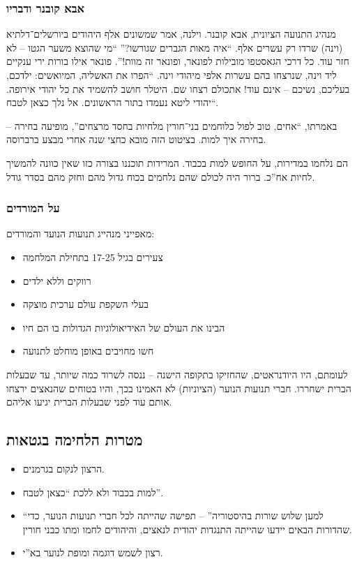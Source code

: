 \documentclass[a4paper]{book}
\begin{document}
	\subsubsection{אבא קובנר ודבריו}
	מנהיג התנועה הציונית, אבא קובנר. וילנה, אמר שמשונים אלף היהודים ביורשלים־דלתיא (וינה) שרדו רק עשרים אלף. ``איה מאות הגברים שגורשו?'' ``מי שהוצא משער הגטו – לא חזר עוד. כל דרכי הגאסטפו מובילות לפונאר, ופונאר זה מוות!''. פונאר אילו בורות ירי ענקיים ליד וינה, שנרצחו בהם עשרות אלפי מיהודי וינה. ``הפרו את האשליה, המיואשים: ילדכם, בעליכם, נשיכם – אינם עוד! אתכולם רצחו שם. היטלר חושב להשמיד את כל יהודי אירופה. יהודי ליטא נעמדו בתור הראשונים. אל נלך כצאן לטבח``. 
	
	באמרתו, ``אחים, טוב לפול כלוחמים בני־חורין מלחיות בחסד מרצחים'', מופיעה בחירה – בחירה איך למות. בציטוט הזה מובא כחצי שנה אחרי מבצע ברברוסה. 
	
	הם נלחמו במדירות, על החופש למות בכבוד. המרידות תוכננו בצורה כזו שאין כוונה להמשיך לחיות אח''כ. ברור היה לכולם שהם נלחמים בכוח גדול מהם וחזק מהם בסדר גודל. 
	
	\subsubsection{על המורדים}
	מאפייני מנהייג תנועות הנועד והמורדים: 
	\begin{itemize}
		\item צעירים בגיל 17-25 בתחילת המלחמה
		\item רווקים וללא ילדים
		\item בעלי השקפת עולם ערכית מוצקה
		\item הבינו את העולם של האידיאולוגיות הגדולות בו הם חיו
		\item חשו מחויבים באופן מוחלט לתנועה
	\end{itemize}
	
	לעומתם, היו היודנראטים, שהחזיקו בתקופה הישנה – ננסה לשרוד כמה שיותר, עד שבעלות הברית ישחררו. חברי תנועות הנוער (הציוניות) לא האמינו בכך, והיו בטוחים שהנאצים ירצחו אותם עוד לפני שבעלות הברית יגיעו אליהם. 
	\subsection{מטרות הלחימה בגטאות}
	\begin{itemize}
		\item הרצון לנקום בגרמנים. 
		\item למות בכבוד ולא ללכת ``כצאן לטבח''. 
		\item ``למען שלוש שורות בהיסטוריה'' – תפישה שהייתה לכל חברי תנועות הנוער, כדי שהדורות הבאים יידעו שהייתה התנגדות יהודית לנאצים, והיהודים לחמו ומתו כבני חורין. 
		\item רצון לשמש דוגמה ומופת לנוער בא''י. 
	\end{itemize}
	
\end{document}
